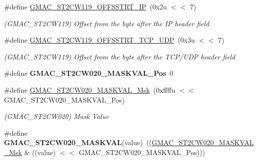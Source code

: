 \begin{DoxyCompactItemize}
\mbox{\label{group__SAMV71__GMAC_gab92aa0c1638bbb0a4071988fd9d92c70}} 
\#define \mbox{\hyperlink{group__SAMV71__GMAC_gab92aa0c1638bbb0a4071988fd9d92c70}{G\+M\+A\+C\+\_\+\+S\+T2\+C\+W119\+\_\+\+O\+F\+F\+S\+S\+T\+R\+T\+\_\+\+IP}}~(0x2u $<$$<$ 7)
\begin{DoxyCompactList}\small\item\em (G\+M\+A\+C\+\_\+\+S\+T2\+C\+W119) Offset from the byte after the IP header field \end{DoxyCompactList}\item 
\mbox{\label{group__SAMV71__GMAC_ga262f36f35c2ac5e16769ac139575389e}} 
\#define \mbox{\hyperlink{group__SAMV71__GMAC_ga262f36f35c2ac5e16769ac139575389e}{G\+M\+A\+C\+\_\+\+S\+T2\+C\+W119\+\_\+\+O\+F\+F\+S\+S\+T\+R\+T\+\_\+\+T\+C\+P\+\_\+\+U\+DP}}~(0x3u $<$$<$ 7)
\begin{DoxyCompactList}\small\item\em (G\+M\+A\+C\+\_\+\+S\+T2\+C\+W119) Offset from the byte after the T\+C\+P/\+U\+DP header field \end{DoxyCompactList}\item 
\mbox{\label{group__SAMV71__GMAC_gabc5883ea3ca153d6d7c24f47bbeaa73b}} 
\#define {\bfseries G\+M\+A\+C\+\_\+\+S\+T2\+C\+W020\+\_\+\+M\+A\+S\+K\+V\+A\+L\+\_\+\+Pos}~0
\item 
\mbox{\label{group__SAMV71__GMAC_ga25062cff7c8b57141ceda474a779c4c8}} 
\#define \mbox{\hyperlink{group__SAMV71__GMAC_ga25062cff7c8b57141ceda474a779c4c8}{G\+M\+A\+C\+\_\+\+S\+T2\+C\+W020\+\_\+\+M\+A\+S\+K\+V\+A\+L\+\_\+\+Msk}}~(0xffffu $<$$<$ G\+M\+A\+C\+\_\+\+S\+T2\+C\+W020\+\_\+\+M\+A\+S\+K\+V\+A\+L\+\_\+\+Pos)
\begin{DoxyCompactList}\small\item\em (G\+M\+A\+C\+\_\+\+S\+T2\+C\+W020) Mask Value \end{DoxyCompactList}\item 
\mbox{\label{group__SAMV71__GMAC_gaa021d1387672f9c05df195043629213d}} 
\#define {\bfseries G\+M\+A\+C\+\_\+\+S\+T2\+C\+W020\+\_\+\+M\+A\+S\+K\+V\+AL}(value)~((\mbox{\hyperlink{group__SAMV71__GMAC_ga25062cff7c8b57141ceda474a779c4c8}{G\+M\+A\+C\+\_\+\+S\+T2\+C\+W020\+\_\+\+M\+A\+S\+K\+V\+A\+L\+\_\+\+Msk}} \& ((value) $<$$<$ G\+M\+A\+C\+\_\+\+S\+T2\+C\+W020\+\_\+\+M\+A\+S\+K\+V\+A\+L\+\_\+\+Pos)))

\end{DoxyCompactItemize}

